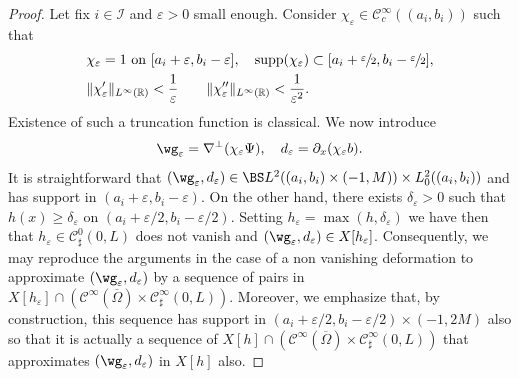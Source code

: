 \begin{proof}
Let fix $i \in \mathcal I$ and $\varepsilon>0$ small enough. Consider $\chi_{\varepsilon} \in \mathcal{C}^{\infty}_{c}((a_{i},b_{i}))$ such that
\[
\begin{aligned}
& \chi_{\varepsilon}=1 \text{ on $[a_{i}+\varepsilon,b_{i}-\varepsilon]$},
\quad
\text{supp}(\chi_{\varepsilon})\subset[a_{i}+\sfrac{\varepsilon}{2},b_{i}-\sfrac{\varepsilon}{2}], \\
& \|\chi_{\varepsilon}'\|_{L^{\infty}(\mathbb R)}<\frac{1}{\varepsilon}
\qquad \|\chi_{\varepsilon}''\|_{L^{\infty}(\mathbb R)}<\frac{1}{\varepsilon^{2}}.
\end{aligned}
\]
Existence of such a truncation function is classical.
We now introduce
\[
\wg_\varepsilon=\nabla^{\perp}(\chi_{\varepsilon}\Psi), \quad
d_{\varepsilon} = \partial_x (\chi_{\varepsilon}b).
\]
It is straightforward that $(\wg_{\varepsilon},d_{\varepsilon}) \in \BS L^2((a_{i},b_{i}) \times (-1,M)) \times L^2_0((a_{i},b_{i}))$ and has support in $(a_i+\varepsilon,b_i-\varepsilon)$. On the other hand, there exists $\delta_{\varepsilon}>0$ such that $h(x)\geq \delta_{\varepsilon}$
on $(a_i+\varepsilon/2,b_i-\varepsilon/2)$. Setting $h_{\varepsilon} = \max(h,\delta_{\varepsilon})$ we have then that $h_{\varepsilon} \in \mathcal C^0_{\sharp}(0,L)$ does not vanish and $(\wg_{\varepsilon},d_{\varepsilon}) \in X[h_{\varepsilon}]$. Consequently, we may reproduce the arguments in the case of a non vanishing deformation to approximate $(\wg_{\varepsilon},d_{\varepsilon})$ by a sequence of pairs
in $X[h_{\varepsilon}] \cap (\mathcal C^{\infty}(\overline{\Omega}) \times \mathcal C^{\infty}_{\sharp}(0,L))$. Moreover, we emphasize that,
by construction, this sequence has support in $(a_i+\varepsilon/2,b_i-\varepsilon/2)\times (-1,2M)$ also so that it is actually a sequence of $X[h] \cap (\mathcal C^{\infty}(\overline{\Omega}) \times \mathcal C^{\infty}_{\sharp}(0,L))$ that approximates $(\wg_{\varepsilon},d_{\varepsilon})$ in $X[h]$ also.


\end{proof}

